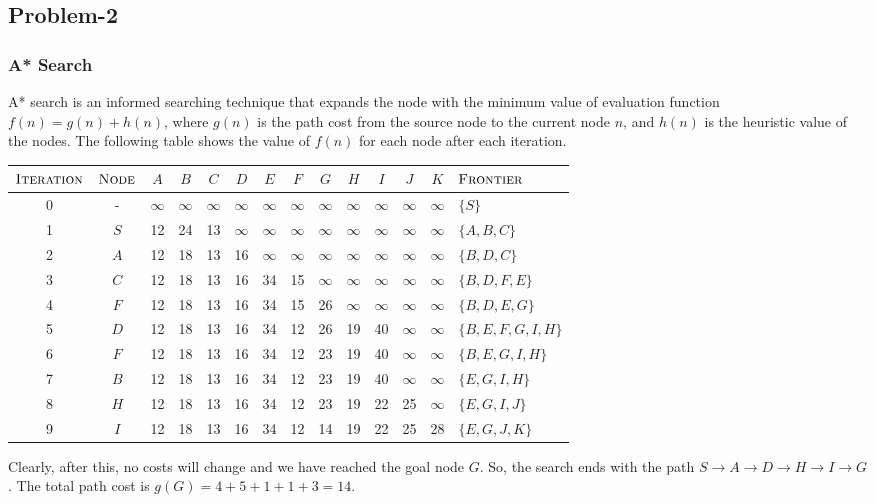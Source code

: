 \documentclass[12pt]{article}
\begin{document}
    \subsection*{Problem-2}
    \subsubsection*{A* Search}
    A* search is an informed searching technique that expands the node with the minimum value of
    evaluation function $f(n) = g(n) + h(n)$, where $g(n)$ is the path cost from the source node
    to the current node $n$, and $h(n)$ is the heuristic value of the nodes. The following
    table shows the value of $f(n)$ for each node after each iteration.
    \begin{center}
        \begin{tabular}{c|c|ccccccccccc|l}
            $\textsc{Iteration}$ & $\textsc{Node}$ & $A$ & $B$ & $C$ & $D$ & $E$ & $F$ & $G$ & $H$ & $I$ & $J$ & $K$ & $\textsc{Frontier}$ \\
            \hline
            0 & - & $\infty$ & $\infty$ & $\infty$ & $\infty$ & $\infty$ & $\infty$ & $\infty$ & $\infty$ & $\infty$ & $\infty$ & $\infty$ & $\{ S \}$ \\
            1 & $S$ & 12 & 24 & 13 & $\infty$ & $\infty$ & $\infty$ & $\infty$ & $\infty$ & $\infty$ & $\infty$ & $\infty$ & $\{ A, B, C \}$ \\
            2 & $A$ & 12 & 18 & 13 & 16 & $\infty$ & $\infty$ & $\infty$ & $\infty$ & $\infty$ & $\infty$ & $\infty$ & $\{ B, D, C \}$ \\
            3 & $C$ & 12 & 18 & 13 & 16 & 34 & 15 & $\infty$ & $\infty$ & $\infty$ & $\infty$ & $\infty$ & $\{ B, D, F, E \}$ \\
            4 & $F$ & 12 & 18 & 13 & 16 & 34 & 15 & 26 & $\infty$ & $\infty$ & $\infty$ & $\infty$ & $\{ B, D, E, G \}$ \\
            5 & $D$ & 12 & 18 & 13 & 16 & 34 & 12 & 26 & 19 & 40 & $\infty$ & $\infty$ & $\{ B, E, F, G, I, H \}$ \\
            6 & $F$ & 12 & 18 & 13 & 16 & 34 & 12 & 23 & 19 & 40 & $\infty$ & $\infty$ & $\{ B, E, G, I, H \}$ \\
            7 & $B$ & 12 & 18 & 13 & 16 & 34 & 12 & 23 & 19 & 40 & $\infty$ & $\infty$ & $\{ E, G, I, H \}$ \\
            8 & $H$ & 12 & 18 & 13 & 16 & 34 & 12 & 23 & 19 & 22 & 25 & $\infty$ & $\{ E, G, I, J \}$ \\
            9 & $I$ & 12 & 18 & 13 & 16 & 34 & 12 & 14 & 19 & 22 & 25 & 28 & $\{ E, G, J, K \}$ \\
        \end{tabular}
    \end{center}
    Clearly, after this, no costs will change and we have reached the goal node $G$. So, the search
    ends with the path $S \rightarrow A \rightarrow D \rightarrow H \rightarrow I \rightarrow G$. The
    total path cost is $g(G) = 4 + 5 + 1 + 1 + 3 = 14$.
\end{document}
